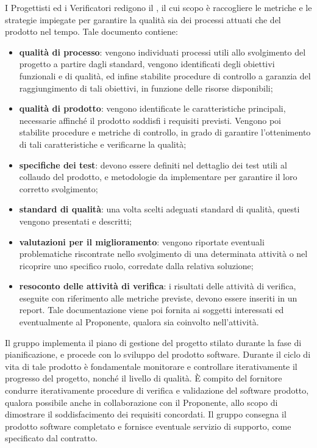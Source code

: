     I Progettisti ed i Verificatori redigono il \PdQ{}, il cui scopo è raccogliere le metriche e le strategie impiegate per garantire la qualità sia dei processi attuati che del prodotto nel tempo. Tale documento contiene:
    \begin{itemize}
       		\item{\textbf{qualità di processo}: vengono individuati processi utili allo svolgimento del progetto a partire dagli standard, vengono identificati degli obiettivi funzionali e di qualità, ed infine stabilite procedure di controllo a garanzia del raggiungimento di tali obiettivi, in funzione delle risorse disponibili;}
       		\item{\textbf{qualità di prodotto}: vengono identificate le caratteristiche principali, necessarie affinché il prodotto soddisfi i requisiti previsti. Vengono poi stabilite procedure e metriche di controllo, in grado di garantire l'ottenimento di tali caratteristiche e verificarne la qualità;}
       		\item{\textbf{specifiche dei test}: devono essere definiti nel dettaglio dei test utili al collaudo del prodotto, e metodologie da implementare per garantire il loro corretto svolgimento;}
       		\item{\textbf{standard di qualità}: una volta scelti adeguati standard di qualità, questi vengono presentati e descritti;}
       		\item{\textbf{valutazioni per il miglioramento}: vengono riportate eventuali problematiche riscontrate nello svolgimento di una determinata attività o nel ricoprire uno specifico ruolo, corredate dalla relativa soluzione;}
       		\item{\textbf{resoconto delle attività di verifica}: i risultati delle attività di verifica, eseguite con riferimento alle metriche previste, devono essere inseriti in un report. Tale documentazione viene poi fornita ai soggetti interessati ed eventualmente al Proponente, qualora sia coinvolto nell'attività.}
    \end{itemize}   
    Il gruppo implementa il piano di gestione del progetto stilato durante la fase di pianificazione, e procede con lo sviluppo del prodotto software. Durante il ciclo di vita di tale prodotto è fondamentale monitorare e controllare iterativamente il progresso del progetto, nonché il livello di qualità.
    È compito del fornitore condurre iterativamente procedure di verifica e validazione del software prodotto, qualora possibile anche in collaborazione con il Proponente, allo scopo di dimostrare il soddisfacimento dei requisiti concordati.
    Il gruppo consegna il prodotto software completato e fornisce eventuale servizio di supporto, come specificato dal contratto.
